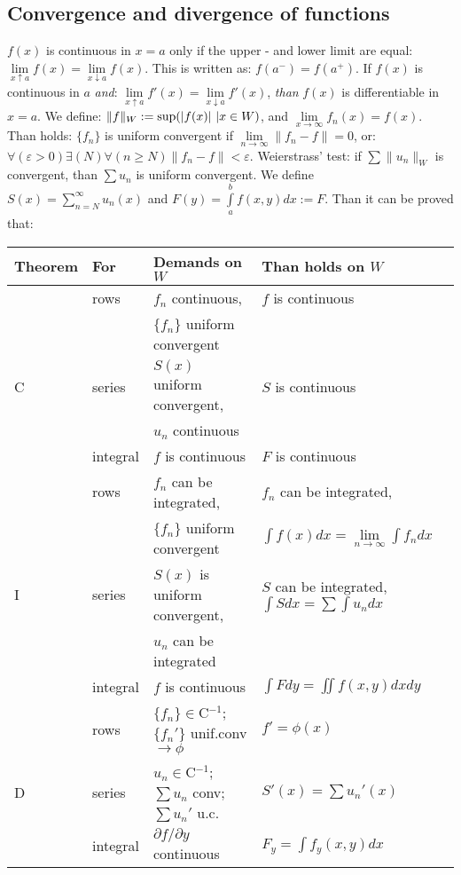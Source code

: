 \documentclass[a4paper,fancyheadings,twoside]{report}
\begin{document}
\subsection{Convergence and divergence of functions}
\label{sec:convf}
$f(x)$ is continuous in $x=a$ only if the upper - and lower limit are equal:
$\lim\limits_{x\uparrow a}f(x)=\lim\limits_{x\downarrow a}f(x)$.
This is written as: $f(a^-)=f(a^+)$.
\npar
If $f(x)$ is continuous in $a$ {\it and}:
$\lim\limits_{x\uparrow a}f'(x)=\lim\limits_{x\downarrow a}f'(x)$,
{\it than} $f(x)$ is differentiable in $x=a$.
\npar
We define: $\|f\|_W:={\rm sup}(|f(x)|~|x\in W)$, and $\lim\limits_{x\rightarrow\infty}f_n(x)=f(x)$.
Than holds: $\{f_n\}$ is uniform convergent if $\lim\limits_{n\rightarrow\infty}\|f_n-f\|=0$,
or: $\forall(\varepsilon>0)\exists(N)\forall(n\geq N)\|f_n-f\|<\varepsilon$.
\npar
Weierstrass' test: if $\sum\|u_n\|_W$ is convergent, than $\sum u_n$ is
uniform convergent.
\npar
We define $\displaystyle S(x)=\sum_{n=N}^\infty u_n(x)$ and
$\displaystyle F(y)=\int\limits_a^bf(x,y)dx:=F$. Than it can be proved that:
\begin{center}
\begin{tabular}{||l|l|p{5cm}|p{6cm}||}
\hline
\bf Theorem&\bf For&\bf Demands on $W$&\bf Than holds on $W$\\
\hline
\hline
 &rows    &$f_n$ continuous,                           &$f$ is continuous\\
 &        &$\{f_n\}$ uniform convergent                &\\
\cline{2-4}
C&series  &$S(x)$ uniform convergent,                  &$S$ is continuous\\
 &        &$u_n$ continuous                            &\\
\cline{2-4}
 &integral&$f$ is continuous                           &$F$ is continuous\\
\hline
 &rows    &$f_n$ can be integrated,                    &$f_n$ can be integrated,\\
 &        &$\{f_n\}$ uniform convergent                &$\int f(x)dx=\lim\limits_{n\rightarrow\infty}\int f_ndx$\rule[-10pt]{0pt}{0pt}\\
\cline{2-4}
I&series  &$S(x)$ is uniform convergent,               &$S$ can be integrated, $\int Sdx=\sum\int u_ndx$\rule{0pt}{13pt}\\
 &        &$u_n$ can be integrated                     &\\
\cline{2-4}
 &integral&$f$ is continuous                           &$\int Fdy=\iint f(x,y)dxdy$\rule{0pt}{13pt}\rule[-8pt]{0pt}{0pt}\\
\hline
 &rows    &$\{f_n\}\in$C$^{-1}$; $\{f_n'\}$ unif.conv $\rightarrow\phi$&$f'=\phi(x)$\rule{0pt}{13pt}\rule[-7pt]{0pt}{0pt}\\
\cline{2-4}
D&series  &$u_n\in$C$^{-1}$; $\sum u_n$ conv; $\sum u_n'$ u.c.&$S'(x)=\sum u_n'(x)$\rule{0pt}{13pt}\rule[-7pt]{0pt}{0pt}\\
\cline{2-4}
 &integral&$\partial f/\partial y$ continuous          &$F_y=\int f_y(x,y)dx$\rule{0pt}{13pt}\rule[-7pt]{0pt}{0pt}\\
\hline
\end{tabular}
\end{center}
\end{document}
